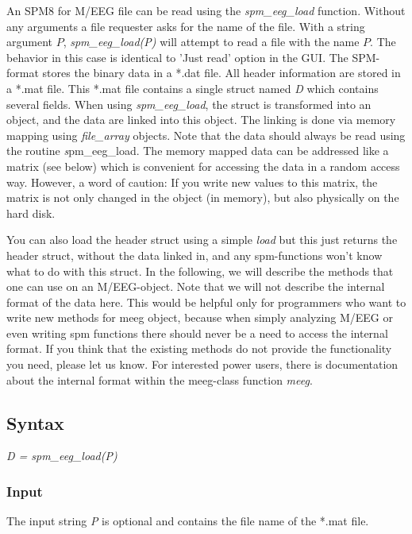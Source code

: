 An SPM8 for M/EEG file can be read using the \textit{spm\_eeg\_load}
function. Without any arguments a file requester asks for the name of
the file. With a string argument $P$, \textit{spm\_eeg\_load(P)} will
attempt to read a file with the name $P$. The behavior in this case is
identical to 'Just read' option in the GUI. The SPM-format stores the
binary data in a *.dat file. All header information are stored in a
*.mat file. This *.mat file contains a single struct named {\textit D}
which contains several fields. When using \textit{spm\_eeg\_load}, the
struct is transformed into an object, and the data are linked into this
object. The linking is done via memory mapping using \textit{file\_array}
objects. Note that the data should always be read using the routine 
{\textit spm\_eeg\_load}. The memory mapped data can be
addressed like a matrix (see below) which is convenient for accessing
the data in a random access way. However, a word of caution: If you
write new values to this matrix, the matrix is not only changed
in the object (in memory), but also physically on the hard
disk.  

You can also load the header struct using a
simple \textit{load} but this just returns the header struct, without the
data linked in, and any spm-functions won't know what to do with this
struct.  In the following, we will describe the methods
that one can use on an M/EEG-object. Note that we will not describe
the internal format of the data here. This would be helpful only for
programmers who want to write new methods for meeg object, because when simply
analyzing M/EEG or even writing spm functions there should never be a need
to access the internal format. If you think that the existing methods do not
provide the functionality you need, please let us know. For interested power users,
there is documentation about the internal format within the meeg-class function 
\textit{meeg}. 

\subsection{Syntax}
\textit{D = spm\_eeg\_load(P)}
\\

\subsubsection{Input}
The input string {\textit P} is optional and contains the file name of the
*.mat file.


